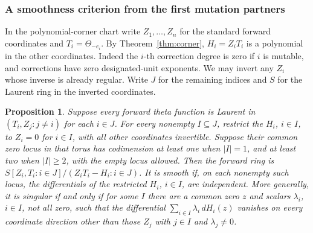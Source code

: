 \documentclass[11pt,reqno]{amsart}
\numberwithin{equation}{section}
\newtheorem{proposition}[theorem]{Proposition}
\theoremstyle{definition}
\theoremstyle{remark}
\begin{document}
\subsubsection{A smoothness criterion from the first mutation partners}

In the polynomial-corner chart write \(Z_1,\ldots,Z_n\) for the
standard forward coordinates and \(T_i=\Theta_{-e_i}\). By
Theorem~\ref{thm:corner}, \(H_i=Z_iT_i\) is a polynomial in the
other coordinates. Indeed the \(i\)-th correction degree is zero
if \(i\) is mutable, and corrections have zero designated-unit
exponents. We may invert any \(Z_i\) whose inverse is already regular. Write \(J\) for the remaining indices and \(S\) for the Laurent ring
in the inverted coordinates.

\begin{proposition}\label{prop:forward-stratum-smoothness}
Suppose every forward theta function is Laurent in
\((T_i,Z_j:j\ne i)\) for each \(i\in J\).
For every nonempty \(I\subseteq J\), restrict the \(H_i\), \(i\in I\),
to \(Z_i=0\) for \(i\in I\), with all other coordinates invertible.
Suppose their common zero locus in that torus has codimension at
least one when \(|I|=1\), and at least two when \(|I|\ge2\), with
the empty locus allowed. Then the forward ring is \(S[Z_i,T_i:i\in J]/(Z_iT_i-H_i:i\in J)\).
It is smooth if, on each nonempty such locus, the differentials
of the restricted \(H_i\), \(i\in I\), are independent.
More generally, it is singular if and only if for some \(I\)
there are a common zero \(z\) and scalars \(\lambda_i\), \(i\in I\),
not all zero, such that the differential
\(\sum_{i\in I}\lambda_i\,dH_i(z)\) vanishes on every coordinate
direction other than those \(Z_j\) with \(j\in I\) and
\(\lambda_j\ne0\).
\end{proposition}
\end{document}
